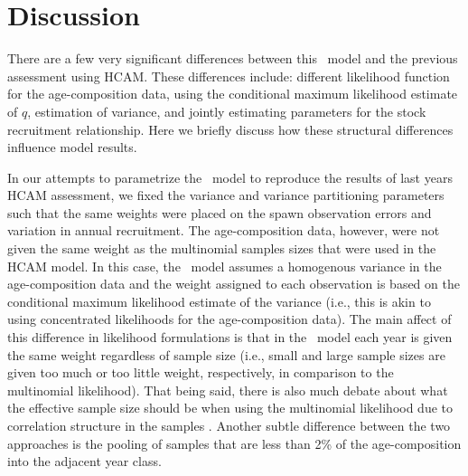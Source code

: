 
\section{Discussion}



There are a few very significant differences between this \iscam\ model and the previous assessment using HCAM. These differences include: different likelihood function for the age-composition data, using the conditional maximum likelihood estimate of $q$, estimation of variance, and jointly estimating parameters for the stock recruitment relationship.  Here we briefly discuss how these structural differences influence model results.

In our attempts to parametrize the \iscam\ model to reproduce the results of last years HCAM assessment, we fixed the variance and variance partitioning parameters such that the same weights were placed on the spawn observation errors and variation in annual recruitment. The age-composition data, however, were not given the same weight as the multinomial samples sizes that were used in the HCAM model. In this case, the \iscam\ model assumes a homogenous variance in the age-composition data and the weight assigned to each observation is based on the conditional maximum likelihood estimate of the variance (i.e., this is akin to using concentrated likelihoods for the age-composition data).  The main affect of this difference in likelihood formulations is that in the \iscam\ model each year is given the same weight regardless of sample size (i.e., small and large sample sizes are given too much or too little weight, respectively, in comparison to the multinomial likelihood).  That being said, there is also much debate about what the effective sample size should be when using the multinomial likelihood due to correlation structure in the samples \citep[e.g.,][]{francis2011data}.  Another subtle difference between the two approaches is the pooling of samples that are less than 2\% of the age-composition into the adjacent year class.


